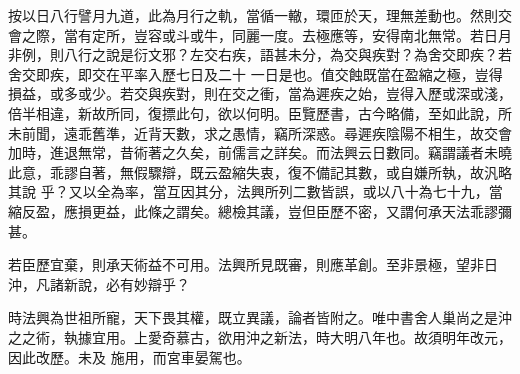 \begin{pinyinscope}
 按以日八行譬月九道，此為月行之軌，當循一轍，環匝於天，理無差動也。然則交會之際，當有定所，豈容或斗或牛，同麗一度。去極應等，安得南北無常。若日月非例，則八行之說是衍文邪？左交右疾，語甚未分，為交與疾對？為舍交即疾？若舍交即疾，即交在平率入歷七日及二十
 一日是也。值交蝕既當在盈縮之極，豈得損益，或多或少。若交與疾對，則在交之衝，當為遲疾之始，豈得入歷或深或淺，倍半相違，新故所同，復摽此句，欲以何明。臣覽歷書，古今略備，至如此說，所未前聞，遠乖舊準，近背天數，求之愚情，竊所深惑。尋遲疾陰陽不相生，故交會加時，進退無常，昔術著之久矣，前儒言之詳矣。而法興云日數同。竊謂議者未曉此意，乖謬自著，無假驟辯，既云盈縮失衷，復不備記其數，或自嫌所執，故汎略其說
 乎？又以全為率，當互因其分，法興所列二數皆誤，或以八十為七十九，當縮反盈，應損更益，此條之謂矣。總檢其議，豈但臣歷不密，又謂何承天法乖謬彌甚。



 若臣歷宜棄，則承天術益不可用。法興所見既審，則應革創。至非景極，望非日沖，凡諸新說，必有妙辯乎？



 時法興為世祖所寵，天下畏其權，既立異議，論者皆附之。唯中書舍人巢尚之是沖之之術，執據宜用。上愛奇慕古，欲用沖之新法，時大明八年也。故須明年改元，因此改歷。未及
 施用，而宮車晏駕也。



\end{pinyinscope}